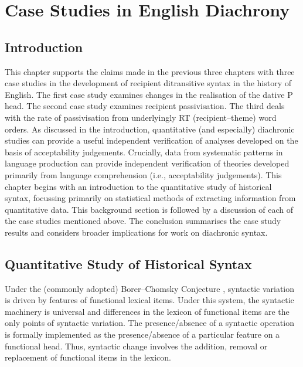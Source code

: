 \chapter{Case Studies in English Diachrony}\label{ch:diachron}
\section{Introduction}
This chapter supports the claims made in the previous three chapters with three case studies in the development of recipient ditransitive syntax in the history of English. The first case study examines changes in the realisation of the dative P head. The second case study examines recipient passivisation. The third deals with the rate of passivisation from underlyingly RT (recipient--theme) word orders. As discussed in the introduction, quantitative (and especially) diachronic studies can provide a useful independent verification of analyses developed on the basis of acceptability judgements. Crucially, data from systematic patterns in language production can provide independent verification of theories developed primarily from language comprehension (i.e., acceptability judgements). This chapter begins with an introduction to the quantitative study of historical syntax, focussing primarily on statistical methods of extracting information from quantitative data. This background section is followed by a discussion of each of the case studies mentioned above. The conclusion summarises the case study results and considers broader implications for work on diachronic syntax.

\section{Quantitative Study of Historical Syntax}\label{sec:log-reg}
	Under the (commonly adopted) Borer--Chomsky Conjecture \citep{Baker.2008}, syntactic variation is driven by features of functional lexical items. Under this system, the syntactic machinery is universal and differences in the lexicon of functional items are the only points of syntactic variation. The presence/absence of a syntactic operation is formally implemented as the presence/absence of a particular feature on a functional head. Thus, syntactic change involves the addition, removal or replacement of functional items in the lexicon.


